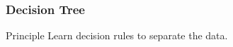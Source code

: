 \documentclass[11pt]{beamer}
\begin{document}
\begin{frame}
  \frametitle{Decision Tree}
  \begin{block}{Principle}
    Learn decision rules to separate the data.
    \begin{center}
    \end{center}
    
  \end{block}

  
\end{frame}
\end{document}
